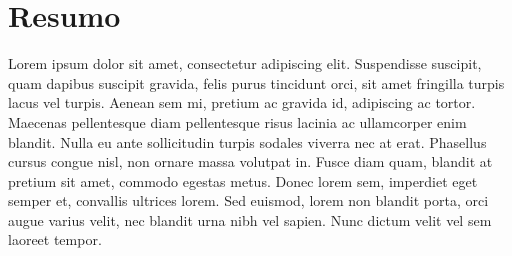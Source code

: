 \chapter*{Resumo}



Lorem ipsum dolor sit amet, consectetur adipiscing elit. Suspendisse suscipit, quam dapibus suscipit gravida, felis purus tincidunt orci, sit amet fringilla turpis lacus vel turpis. Aenean sem mi, pretium ac gravida id, adipiscing ac tortor. Maecenas pellentesque diam pellentesque risus lacinia ac ullamcorper enim blandit. Nulla eu ante sollicitudin turpis sodales viverra nec at erat. Phasellus cursus congue nisl, non ornare massa volutpat in. Fusce diam quam, blandit at pretium sit amet, commodo egestas metus. Donec lorem sem, imperdiet eget semper et, convallis ultrices lorem. Sed euismod, lorem non blandit porta, orci augue varius velit, nec blandit urna nibh vel sapien. Nunc dictum velit vel sem laoreet tempor.
